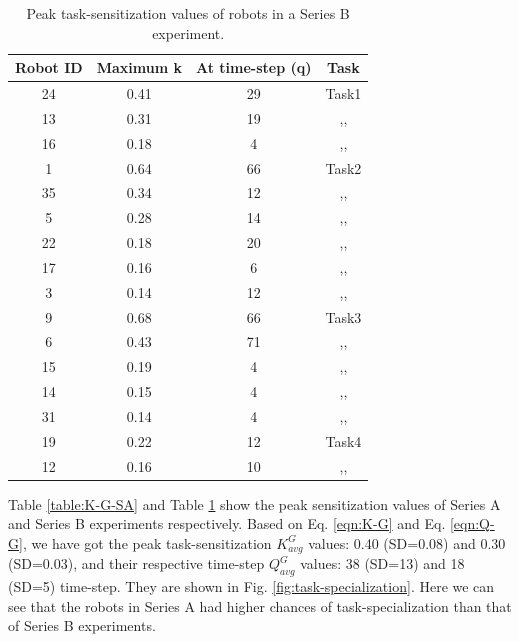 \documentclass[final,5p,times,twocolumn]{elsarticle}
\begin{document}
\begin{table}
\centering
\caption{Peak task-sensitization values of robots in a Series B experiment.}
\begin{tabular}{|c|c|c|c|}
\hline \textbf{Robot ID} & \textbf{Maximum k} & \textbf{At time-step (q)} & \textbf{Task} \\
\hline 24 & 0.41 & 29 & Task1\\
\hline 13 & 0.31 & 19 & ,,\\
\hline 16 & 0.18 & 4 & ,,\\
\hline 1 & 0.64 & 66 & Task2\\
\hline 35 & 0.34 & 12 & ,,\\
\hline 5 & 0.28 & 14 & ,,\\
\hline 22 & 0.18 & 20 & ,,\\
\hline 17 & 0.16 & 6 & ,,\\
\hline 3 & 0.14 & 12 & ,,\\
\hline 9 & 0.68 & 66 & Task3\\
\hline 6 & 0.43 & 71 & ,,\\
\hline 15 & 0.19 & 4 & ,,\\
\hline 14 & 0.15 & 4 & ,,\\
\hline 31 & 0.14 & 4 & ,,\\
\hline 19 & 0.22 & 12 & Task4\\
\hline 12 & 0.16 & 10 & ,,\\
\hline 
\end{tabular} 
\label{table:K-G-SB}
\end{table}
Table \ref{table:K-G-SA} and Table \ref{table:K-G-SB} show the peak sensitization values of Series A and Series B experiments respectively.  Based on Eq. \ref{eqn:K-G} and Eq. \ref{eqn:Q-G}, we have got the peak task-sensitization $K^G_{avg} 
$ values: 0.40 (SD=0.08)  and 0.30 (SD=0.03), and their respective time-step $Q^G_{avg}$ values: 38 (SD=13) and 18 (SD=5) time-step.  They are shown in Fig. \ref{fig:task-specialization}. Here we can see that the robots in Series A had higher chances of task-specialization than that of Series B experiments.
\end{document}
